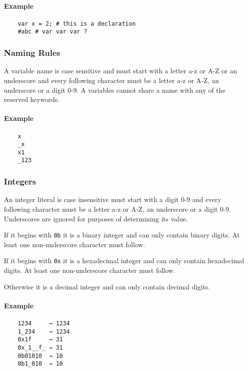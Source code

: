 \documentclass[12pt, a4paper]{article}
\begin{document}
\paragraph{Example}

\begin{verbatim}
    var x = 2; # this is a declaration
    #abc # var var var ?
\end{verbatim}

\subsubsection{Naming Rules}

A variable name is case sensitive and must start with a letter a-z or A-Z or an underscore and every following character must be a letter a-z or A-Z, an underscore or a digit 0-9. A variables cannot share a name with any of the reserved keywords.

\paragraph{Example}

\begin{verbatim}
    x
    _x
    x1
    _123    
\end{verbatim}

\subsubsection{Integers}

An integer literal is case insensitive must start with a digit 0-9 and every following character must be a letter a-z or A-Z, an underscore or a digit 0-9. Underscores are ignored for purposes of determining its value.

If it begins with \verb|0b| it is a binary integer and can only contain binary digits. At least one non-underscore character must follow.

If it begins with \verb|0x| it is a hexadecimal integer and can only contain hexadecimal digits. At least one non-underscore character must follow.

Otherwise it is a decimal integer and can only contain decimal digits.

\paragraph{Example}

\begin{verbatim}
    1234     → 1234
    1_234    → 1234
    0x1f     → 31
    0x_1__f_ → 31
    0b01010  → 10
    0b1_010  → 10
\end{verbatim}
\end{document}

